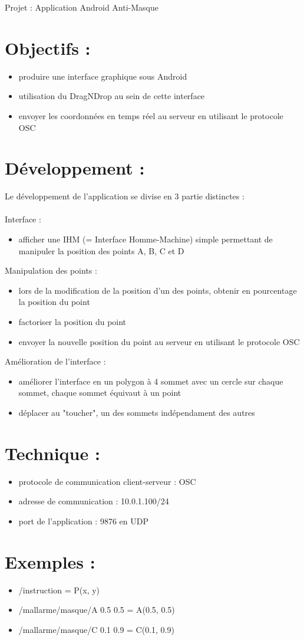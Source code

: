 \documentclass[a4paper, notitlepage, twoside]{article}
\begin{document}
Projet : Application Android Anti-Masque

\section{Objectifs :}
\begin{itemize}
	\item produire une interface graphique sous Android
	\item utilisation du DragNDrop au sein de cette interface
	\item envoyer les coordonnées en temps réel au serveur en utilisant le protocole OSC
\end{itemize}

\section{Développement :}
Le développement de l'application se divise en 3 partie distinctes :
\\ \\
\noindent Interface :
\begin{itemize}
	\item afficher une IHM (= Interface Homme-Machine) simple permettant de manipuler la position des points A, B, C et D
\end{itemize}
Manipulation des points :
\begin{itemize}
	\item lors de la modification de la position d'un des points, obtenir en pourcentage la position du point
	\item factoriser la position du point
	\item envoyer la nouvelle position du point au serveur en utilisant le protocole OSC
\end{itemize}
	Amélioration de l'interface :
\begin{itemize}
	\item améliorer l'interface en un polygon à 4 sommet avec un cercle sur chaque sommet, chaque sommet équivaut à un point
	\item déplacer au "toucher", un des sommets indépendament des autres
\end{itemize}

\section{Technique :}
\begin{itemize}
	\item protocole de communication client-serveur : OSC
	\item adresse de communication : 10.0.1.100/24
	\item port de l'application : 9876 en UDP
\end{itemize}


\section{Exemples :}
\begin{itemize}
	\item /instruction = P(x, y)
	\item /mallarme/masque/A 0.5 0.5 = A(0.5, 0.5)
	\item /mallarme/masque/C 0.1 0.9 = C(0.1, 0.9)
\end{itemize}
\end{document}
